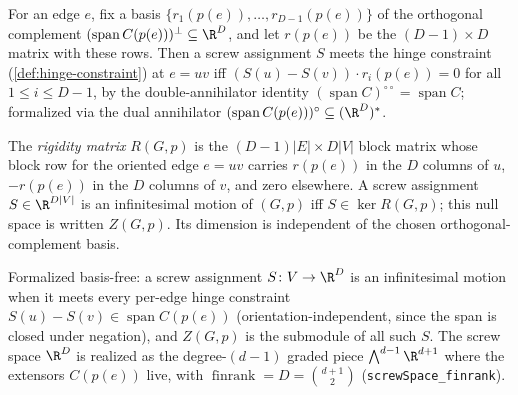 \begin{definition}
  \label{def:hinge-row-block}
  \leanok
  For an edge $e$, fix a basis
  $\{r_1(p(e)), \dots, r_{D-1}(p(e))\}$ of the orthogonal complement
  $(\operatorname{span} C(p(e)))^{\perp} \subseteq \R^{D}$, and let
  $r(p(e))$ be the $(D-1)\times D$ matrix with these rows. Then a screw
  assignment $S$ meets the hinge constraint
  (\cref{def:hinge-constraint}) at $e = uv$ iff
  $(S(u) - S(v)) \cdot r_i(p(e)) = 0$ for all $1 \le i \le D-1$, by the
  double-annihilator identity
  $(\operatorname{span} C)^{\circ\circ} = \operatorname{span} C$;
  formalized via the dual annihilator
  $(\operatorname{span} C(p(e)))^{\circ} \subseteq (\R^{D})^{*}$.
\end{definition}

\begin{definition}
  \label{def:rigidity-matrix}
  \leanok
  The \emph{rigidity matrix} $R(G,p)$ is the $(D-1)|E| \times D|V|$ block
  matrix whose block row for the oriented edge $e = uv$ carries
  $r(p(e))$ in the $D$ columns of $u$, $-r(p(e))$ in the $D$ columns of
  $v$, and zero elsewhere. A screw assignment $S \in \R^{D|V|}$ is an
  infinitesimal motion of $(G,p)$ iff $S \in \ker R(G,p)$; this null
  space is written $Z(G,p)$. Its dimension is independent of the chosen
  orthogonal-complement basis.

  Formalized basis-free: a screw assignment $S \colon V \to \R^{D}$ is
  an infinitesimal motion when it meets every per-edge hinge constraint
  $S(u) - S(v) \in \operatorname{span} C(p(e))$ (orientation-independent,
  since the span is closed under negation), and $Z(G,p)$ is the submodule
  of all such $S$. The screw space $\R^{D}$ is realized as the degree-$(d-1)$
  graded piece $\bigwedge^{d-1}\R^{d+1}$ where the extensors $C(p(e))$
  live, with $\operatorname{finrank} = D = \binom{d+1}{2}$
  (\texttt{screwSpace\_finrank}).
\end{definition}

